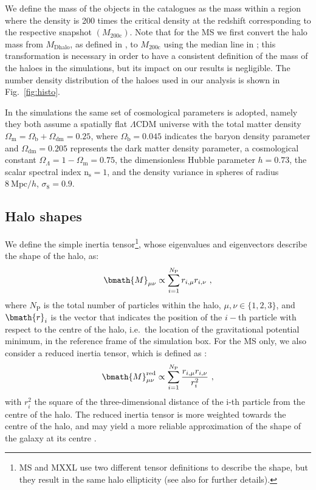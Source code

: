 \documentclass[a4paper,fleqn,usenatbib]{mnras}
\begin{document}
We define the mass of the objects in the catalogues as the mass within a region where the density is 200 times the critical density at the redshift corresponding to the respective snapshot $(M_{200\mathrm{c}})$. Note that for the MS we first convert the halo mass from $M_{\mathrm{Dhalo}}$, as defined in \citet{Jiangetal2014}, to $M_{200\mathrm{c}}$ using the median line in \citet[figure 2]{Jiangetal2014}; this transformation is necessary in order to have a consistent definition of the mass of the haloes in the simulations, but its impact on our results is negligible. The number density distribution of the haloes used in our analysis is shown in Fig.~\ref{fig:histo}.

In the simulations the same set of cosmological parameters is adopted, namely they both assume a spatially flat $\Lambda$CDM universe with the total matter density $\Omega_{\mathrm{m}} = \Omega_{\mathrm{b}} + \Omega_{\mathrm{dm}} = 0.25$, where $\Omega _{\mathrm{b}} = 0.045$ indicates the baryon density parameter and $\Omega_{\mathrm{dm}} = 0.205$ represents the dark matter density parameter, a cosmological constant $\Omega_{\Lambda} = 1 - \Omega_{\mathrm{m}} = 0.75$, the dimensionless Hubble parameter $h = 0.73$, the scalar spectral index $\mathrm{n}_{\mathrm{s}} = 1$, and the density variance in spheres of radius $8 \ \mathrm{Mpc}/h$, $\sigma_8 = 0.9$. 

\subsection{Halo shapes}
\label{subsec:haloshapes}
We define the simple inertia tensor\footnote{MS and MXXL use two different tensor definitions to describe the shape, but they result in the same halo ellipticity (see also \citealt{Bettetal2007} for further details).}, whose eigenvalues and eigenvectors describe the shape of the halo, as:
\begin{equation}
    \bmath{M}_{\mu \nu} \propto \sum_{i=1}^{N_{\mathrm{P}}} r_{i, \mu} r_{i, \nu} \ ,
	\label{eq:sit}
\end{equation}
where $N_{\mathrm{P}}$ is the total number of particles within the halo, $\mu, \nu \in \{1, 2, 3\}$, and $\bmath{r}_{i}$ is the vector that indicates the position of the $i-$th particle with respect to the centre of the halo, i.e.\ the location of the gravitational potential minimum, in the reference frame of the simulation box. For the MS only, we also consider a reduced inertia tensor, which is defined as \citep{Pereiraetal2008}:
\begin{equation}
    \bmath{M}_{\mu \nu}^{\mathrm{red}} \propto \sum _{i=1}^{N_{\mathrm{P}}} \frac{r_{i, \mu} r_{i, \nu}}{r_i^2} \ ,
	\label{eq:rit}
\end{equation}
with $r_i^2$ the square of the three-dimensional distance of the i-th particle from the centre of the halo. The reduced inertia tensor is more weighted towards the centre of the halo, and may yield a more reliable approximation of the shape of the galaxy at its centre \citep{Joachimietal2013b, Chisarietal2015}. 
\end{document}
